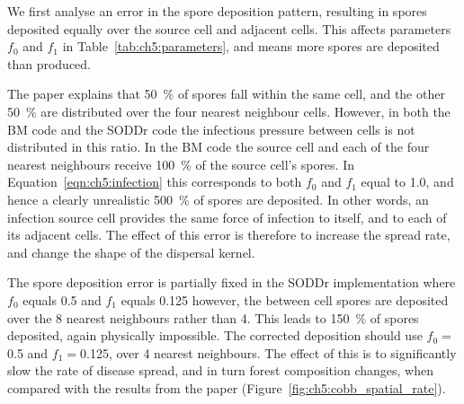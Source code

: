 We first analyse an error in the spore deposition pattern, resulting in spores deposited equally over the source cell and adjacent cells. This affects parameters $f_0$ and $f_1$ in Table~\ref{tab:ch5:parameters}, and means more spores are deposited than produced.

The paper explains that \SI{50}{\percent} of spores fall within the same cell, and the other \SI{50}{\percent} are distributed over the four nearest neighbour cells. However, in both the BM code and the SODDr code the infectious pressure between cells is not distributed in this ratio. In the BM code the source cell and each of the four nearest neighbours receive \SI{100}{\percent} of the source cell's spores. In Equation~\ref{eqn:ch5:infection} this corresponds to both $f_0$ and $f_1$ equal to \num{1.0}, and hence a clearly unrealistic \SI{500}{\percent} of spores are deposited. In other words, an infection source cell provides the same force of infection to itself, and to each of its adjacent cells. The effect of this error is therefore to increase the spread rate, and change the shape of the dispersal kernel.

The spore deposition error is partially fixed in the SODDr implementation where $f_0$ equals 0.5 and $f_1$ equals \num{0.125} however, the between cell spores are deposited over the 8 nearest neighbours rather than 4. This leads to \SI{150}{\percent} of spores deposited, again physically impossible. The corrected deposition should use $f_0=$\num{0.5} and $f_1=$\num{0.125}, over 4 nearest neighbours. The effect of this is to significantly slow the rate of disease spread, and in turn forest composition changes, when compared with the results from the paper (Figure~\ref{fig:ch5:cobb_spatial_rate}).

